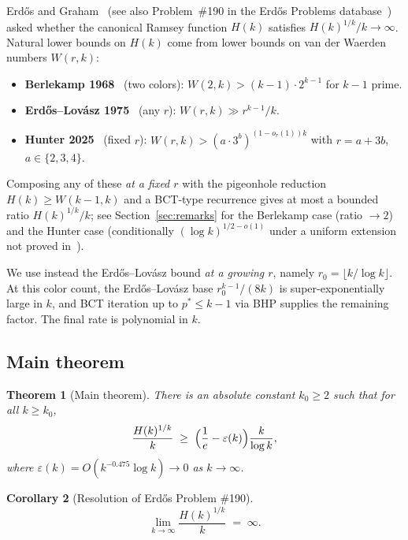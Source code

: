 \documentclass[11pt,reqno,a4paper]{amsart}
\theoremstyle{plain}
\newtheorem{theorem}{Theorem}[section]
\newtheorem{corollary}[theorem]{Corollary}
\theoremstyle{definition}
\theoremstyle{remark}
\numberwithin{equation}{section}
\begin{document}
Erd\H{o}s and Graham~\cite{ErdosGraham1980} (see also Problem~\#190
in the Erd\H{o}s Problems database~\cite{Bloom2023}) asked whether
the canonical Ramsey function $H(k)$ satisfies $H(k)^{1/k}/k\to\infty$.
Natural lower bounds on $H(k)$ come from lower bounds on van der
Waerden numbers $W(r,k)$:
\begin{itemize}
\item \textbf{Berlekamp 1968}~\cite{Berlekamp1968} (two colors):
  $W(2,k)>(k-1)\cdot 2^{k-1}$ for $k-1$ prime.
\item \textbf{Erd\H{o}s--Lov\'asz 1975}~\cite{ErdosLovasz1975} (any $r$):
  $W(r,k)\gg r^{k-1}/k$.
\item \textbf{Hunter 2025}~\cite{Hunter2025} (fixed $r$):
  $W(r,k)>(a\cdot 3^{b})^{(1-o_{r}(1))k}$ with $r=a+3b$, $a\in\{2,3,4\}$.
\end{itemize}
Composing any of these \emph{at a fixed $r$} with the pigeonhole
reduction $H(k)\ge W(k-1,k)$ and a BCT-type recurrence gives at most
a bounded ratio $H(k)^{1/k}/k$; see Section~\ref{sec:remarks} for the
Berlekamp case (ratio $\to 2$) and the Hunter case (conditionally
$(\log k)^{1/2-o(1)}$ under a uniform extension not proved
in~\cite{Hunter2025}).

We use instead the Erd\H{o}s--Lov\'asz bound \emph{at a growing $r$},
namely $r_{0}=\lfloor k/\log k\rfloor$. At this color
count, the Erd\H{o}s--Lov\'asz base $r_{0}^{k-1}/(8k)$ is
super-exponentially large in $k$, and BCT iteration up to
$p^{*}\le k-1$ via BHP supplies the remaining factor. The final rate
is polynomial in $k$.

\subsection{Main theorem}
\label{subsec:main}

\begin{theorem}[Main theorem]
\label{thm:main}
There is an absolute constant $k_{0}\ge 2$ such that for all $k\ge k_{0}$,
\begin{equation}
\frac{H(k)^{1/k}}{k}\;\ge\;\Bigl(\frac{1}{e}-\varepsilon(k)\Bigr)\frac{k}{\log k},
\label{eq:main}
\end{equation}
where $\varepsilon(k)=O(k^{-0.475}\log k)\to 0$ as $k\to\infty$.
\end{theorem}

\begin{corollary}[Resolution of Erd\H{o}s Problem \#190]
\label{cor:p190}
\[
\lim_{k\to\infty}\frac{H(k)^{1/k}}{k}\;=\;\infty.
\]
\end{corollary}
\end{document}
